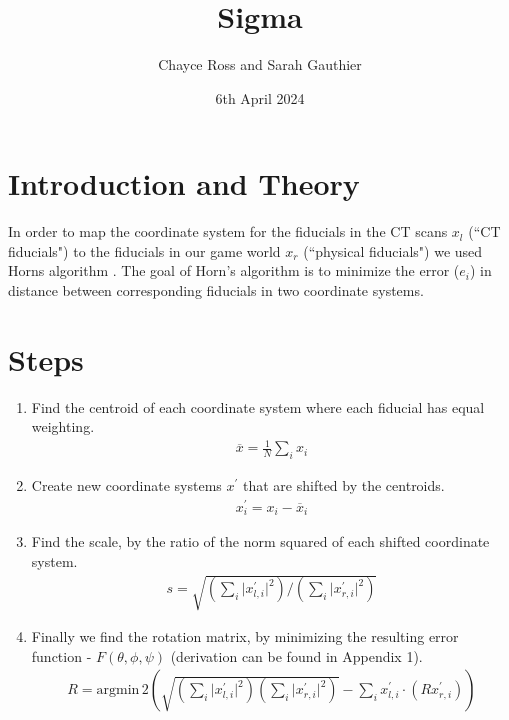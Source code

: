 \documentclass{article}
\title{Sigma}
\author{Chayce Ross and Sarah Gauthier}
\date{6th April 2024}
\begin{document}
\maketitle
\section*{Introduction and Theory}
In order to map the coordinate system for the fiducials in the CT scans \(x_l\)  (``CT fiducials") to the fiducials in our game world \(x_r\) (``physical fiducials") we used Horns algorithm \autocite{RoboticsRegistration}.
The goal of Horn's algorithm is to minimize the error (\(e_i\)) in distance between corresponding fiducials in two coordinate systems.
\section*{Steps}
\begin{enumerate}
    \item Find the centroid of each coordinate system where each fiducial has equal weighting. 
    \begin{align*}
        \overline{x}  = \frac{1}{N} \sum_i x_i 
    \end{align*}
    \item Create new coordinate systems \(x^{\prime}\) that are shifted by the centroids.
    \begin{align*}
        x^{\prime}_i = x_i - \overline{x}_i 
    \end{align*}
    \item Find the scale, by the ratio of the norm squared of each shifted coordinate system. 
    \begin{align*}
        s = \sqrt{\left( \sum_{i} \vert x^{\prime}_{l,i} \vert ^{2}  \right) \bigg/ \left( \sum_{i} \vert x^{\prime}_{r,i} \vert ^{2}  \right)} 
    \end{align*}
    \item Finally we find the rotation matrix, by minimizing the resulting error function - \(F(\theta ,\phi, \psi)\)  (derivation can be found in Appendix 1).
    \begin{align*}
        R = \text{argmin} \,2 \left( \sqrt{\left( \sum_{i} \vert x^{\prime}_{l,i} \vert ^{2}  \right) \left( \sum_{i} \vert x^{\prime}_{r,i} \vert ^{2}  \right)}  - \sum_{i}  x^{\prime}_{l,i} \cdot \left( R x^{\prime}_{r,i} \right) \right) 
    \end{align*}
\end{enumerate}
\end{document}
